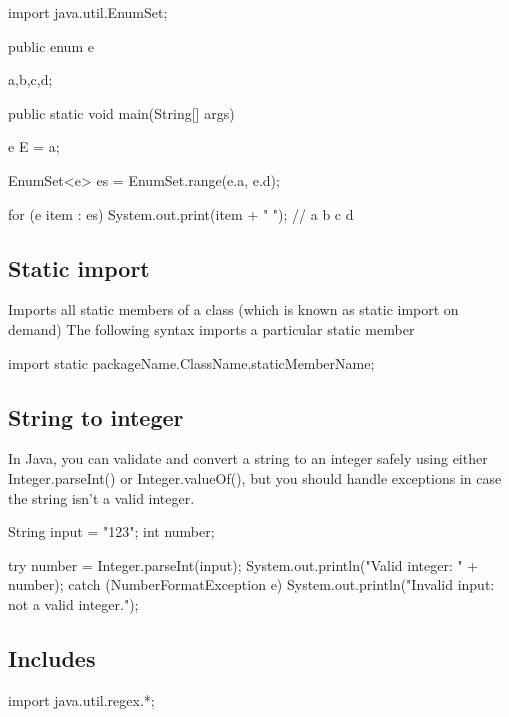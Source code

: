\documentclass{report}
\begin{document}
    \bigbreak \noindent 
    \begin{javacode}
        import java.util.EnumSet;

        public enum e{
            a,b,c,d;

            public static void main(String[] args) {
                e E = a;

                EnumSet<e> es = EnumSet.range(e.a, e.d);

                for (e item : es) System.out.print(item + " ");
                // a b c d
            }
        }
    \end{javacode}

    \bigbreak \noindent 
    \subsection{Static import}
    \bigbreak \noindent 
    Imports all static members of a class (which is known as static import on demand)
    \bigbreak \noindent 
    The following syntax imports a particular static member
    \bigbreak \noindent 
    \begin{javacode}
    import static packageName.ClassName.staticMemberName;
    \end{javacode}

    \pagebreak 
    \bigbreak \noindent 
    \subsection{String to integer}
    In Java, you can validate and convert a string to an integer safely using either Integer.parseInt() or Integer.valueOf(), but you should handle exceptions in case the string isn’t a valid integer.
    \bigbreak \noindent 
    \begin{javacode}
        String input = "123";
        int number;

        try {
            number = Integer.parseInt(input);
            System.out.println("Valid integer: " + number);
        } catch (NumberFormatException e) {
            System.out.println("Invalid input: not a valid integer.");
        }
    \end{javacode}

    \pagebreak 
    \subsection{Includes}
    \bigbreak \noindent 
    \begin{javacode}
    import java.util.regex.*;
    \end{javacode}
\end{document}
